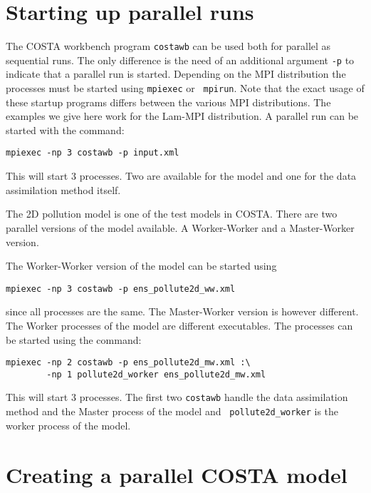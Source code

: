 \documentclass[a4paper,12pt]{article}
\begin{document}
\section{Starting up parallel runs}
The COSTA workbench program {\tt costawb} can be used both for parallel as
sequential runs. The only difference is the need of an additional argument
{\tt -p} to indicate that a parallel run is started. Depending on the MPI
distribution the processes must be started using {\tt mpiexec} or {\tt
mpirun}. Note that the exact usage of these startup programs differs between the
various MPI distributions. The examples we give here work for the Lam-MPI
distribution. A parallel run can be started with the command:
\begin{verbatim}
mpiexec -np 3 costawb -p input.xml
\end{verbatim}
This will start 3 processes. Two are available for the model and one for
the data assimilation method itself.

The 2D pollution model is one of the test models in COSTA. There are two
parallel versions of the model available. A Worker-Worker and a
Master-Worker version.

The Worker-Worker version of the model can be started using 
\begin{verbatim}
mpiexec -np 3 costawb -p ens_pollute2d_ww.xml
\end{verbatim}
since all processes are the same. The Master-Worker version is however
different. The Worker processes of the model are different executables.
The processes can be started using the command:
\begin{verbatim}
mpiexec -np 2 costawb -p ens_pollute2d_mw.xml :\
        -np 1 pollute2d_worker ens_pollute2d_mw.xml
\end{verbatim}
This will start 3 processes. The first two {\tt costawb} handle the data
assimilation method and the Master process of the model and {\tt
pollute2d\_worker} is the worker process of the model.

\section{Creating a parallel COSTA model}
\end{document}
